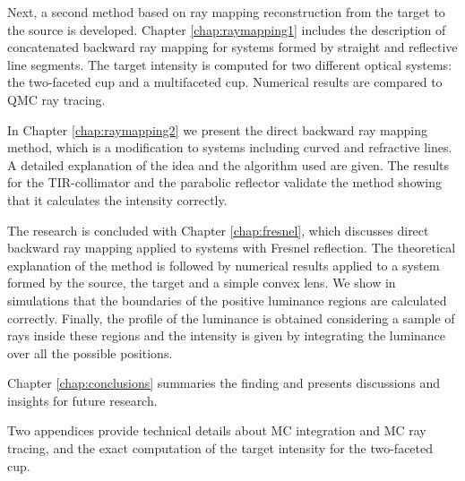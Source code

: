 Next, a second method based on ray mapping reconstruction from the target to the source is developed. Chapter \ref{chap:raymapping1} includes the description of concatenated backward ray mapping for systems formed by straight and reflective line segments. The target intensity is computed for two different optical systems: the two-faceted cup and a multifaceted cup. Numerical results are compared to QMC ray tracing. 

In Chapter \ref{chap:raymapping2} we present the direct backward ray mapping method, which is a modification to systems including curved and refractive lines. A detailed explanation of the idea and the algorithm used are given. The results for the TIR-collimator and the parabolic reflector validate the method showing that it calculates the intensity correctly. 

The research is concluded with Chapter \ref{chap:fresnel}, which discusses direct backward ray mapping applied to systems with Fresnel reflection. The theoretical explanation of the method is followed by numerical results applied to a system formed by the source, the target and a simple convex lens. We show in simulations that the boundaries of the positive luminance regions are calculated correctly. Finally, the profile of the luminance is obtained considering a sample of rays inside these regions and the intensity is given by integrating the luminance over all the possible positions. 

Chapter \ref{chap:conclusions} summaries the finding and presents discussions and insights for future research.

Two appendices provide technical details about MC integration and MC ray tracing, and the exact computation of the target intensity for the two-faceted cup.
\clearpage{\pagestyle{empty}\cleardoublepage}
 